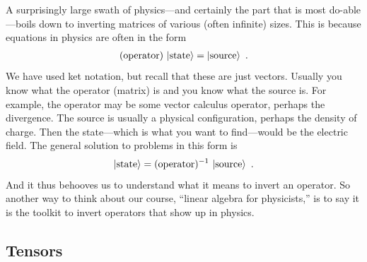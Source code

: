 \begin{bigidea}\label{idea:matrix:inverse:in:physics}
A surprisingly large swath of physics---and certainly the part that is most do-able---boils down to inverting matrices of various (often infinite) sizes. This is because equations in physics are often in the form
\begin{align}
    (\textnormal{operator})\, \left|\textnormal{state}\right\rangle = \left|\textnormal{source}\right\rangle \ .
\end{align}
We have used ket notation, but recall that these are just vectors. Usually you know what the operator (matrix) is and you know what the source is. For example, the operator may be some vector calculus operator, perhaps the divergence. The source is usually a physical configuration, perhaps the density of charge. Then the state---which is what you want to find---would be the electric field. The general solution to problems in this form is
\begin{align}
 \left|\textnormal{state}\right\rangle = (\textnormal{operator})^{-1}\, \left|\textnormal{source}\right\rangle \ .
\end{align}
And it thus behooves us to understand what it means to invert an operator. So another way to think about our course, ``linear algebra for physicists,'' is to say it is the toolkit to invert operators that show up in physics.
\end{bigidea}

\subsection{Tensors}
\label{sec:index:tensors:rotation:on:each:index}

